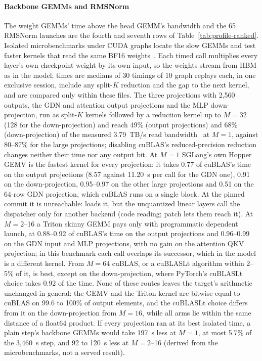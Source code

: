 \paragraph{Backbone GEMMs and RMSNorm} The weight GEMMs' time above the head GEMM's bandwidth and the 65 RMSNorm launches are the fourth and seventh rows of Table~\ref{tab:profile-ranked}. Isolated microbenchmarks under CUDA graphs locate the slow GEMMs and test faster kernels that read the same BF16 weights~. Each timed call multiplies every layer's own checkpoint weight by its own input, so the weights stream from HBM as in the model; times are medians of 30 timings of 10 graph replays each, in one exclusive session, include any split-$K$ reduction and the gap to the next kernel, and are compared only within these files. The three projections with 2,560 outputs, the GDN and attention output projections and the MLP down-projection, run as split-$K$ kernels followed by a reduction kernel up to $M=32$ (128 for the down-projection) and reach 49\% (output projections) and 68\% (down-projection) of the measured 3.79~TB/s read bandwidth~ at $M=1$, against 80--87\% for the large projections; disabling cuBLAS's reduced-precision reduction changes neither their time nor any output bit. At $M=1$ SGLang's own Hopper GEMV is the fastest kernel for every projection: it takes 0.77 of cuBLAS's time on the output projections (8.57 against 11.20~\textmu s per call for the GDN one), 0.91 on the down-projection, 0.95--0.97 on the other large projections and 0.51 on the 64-row GDN projection, which cuBLAS runs on a single block. At the pinned commit it is unreachable:  loads it, but the unquantized linear layers call the dispatcher only for another backend (code reading; patch  lets them reach it). At $M=2$--16 a Triton skinny GEMM pays only with programmatic dependent launch, at 0.88--0.92 of cuBLAS's time on the output projections and 0.96--0.99 on the GDN input and MLP projections, with no gain on the attention QKV projection; in this benchmark each call overlaps its successor, which in the model is a different kernel. From $M=64$ cuBLAS, or a cuBLASLt algorithm within 2--5\% of it, is best, except on the down-projection, where PyTorch's cuBLASLt choice takes 0.92 of the time. None of these routes leaves the target's arithmetic unchanged in general: the GEMV and the Triton kernel are bitwise equal to cuBLAS on 99.6 to 100\% of output elements, and the cuBLASLt choice differs from it on the down-projection from $M=16$, while all arms lie within the same distance of a float64 product. If every projection ran at its best isolated time, a plain step's backbone GEMMs would take 197~\textmu s less at $M=1$, at most 5.7\% of the 3,460~\textmu s step, and 92 to 120~\textmu s less at $M=2$--16 (derived from the microbenchmarks, not a served result).

